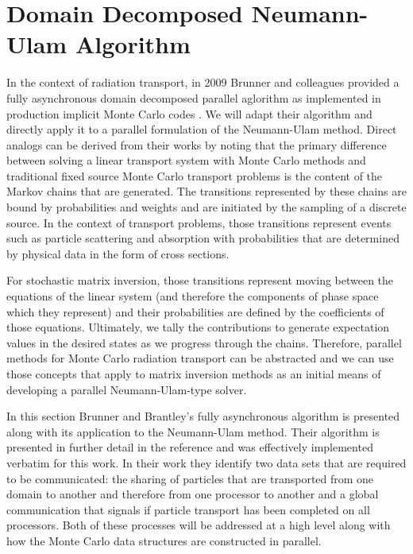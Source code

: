 \clearpage

\section{Domain Decomposed Neumann-Ulam Algorithm\ }
\label{sec:asynchronous_algorithm}
In the context of radiation transport, in 2009 Brunner and colleagues
provided a fully asynchronous domain decomposed parallel aglorithm as
implemented in production implicit Monte Carlo codes
\citep{brunner_efficient_2009}. We will adapt their algorithm and
directly apply it to a parallel formulation of the Neumann-Ulam
method. Direct analogs can be derived from their works by noting that
the primary difference between solving a linear transport system with
Monte Carlo methods and traditional fixed source Monte Carlo transport
problems is the content of the Markov chains that are generated. The
transitions represented by these chains are bound by probabilities and
weights and are initiated by the sampling of a discrete source. In the
context of transport problems, those transitions represent events such
as particle scattering and absorption with probabilities that are
determined by physical data in the form of cross sections.

For stochastic matrix inversion, those transitions represent moving
between the equations of the linear system (and therefore the
components of phase space which they represent) and their
probabilities are defined by the coefficients of those
equations. Ultimately, we tally the contributions to generate
expectation values in the desired states as we progress through the
chains. Therefore, parallel methods for Monte Carlo radiation
transport can be abstracted and we can use those concepts that apply
to matrix inversion methods as an initial means of developing a
parallel Neumann-Ulam-type solver. 

In this section Brunner and Brantley's fully asynchronous algorithm is
presented along with its application to the Neumann-Ulam method. Their
algorithm is presented in further detail in the reference and was
effectively implemented verbatim for this work. In their work they
identify two data sets that are required to be communicated: the
sharing of particles that are transported from one domain to another
and therefore from one processor to another and a global communication
that signals if particle transport has been completed on all
processors. Both of these processes will be addressed at a high level
along with how the Monte Carlo data structures are
constructed in parallel.

